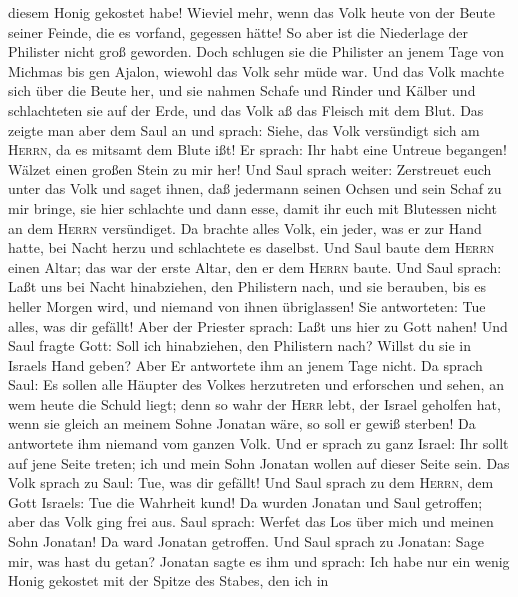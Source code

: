 diesem Honig gekostet habe!  Wieviel mehr, wenn das Volk
heute von der Beute seiner Feinde, die es vorfand, gegessen hätte! So
aber ist die Niederlage der Philister nicht groß geworden.
 Doch schlugen sie die Philister an jenem Tage von
Michmas bis gen Ajalon, wiewohl das Volk sehr müde war. 
Und das Volk machte sich über die Beute her, und sie nahmen Schafe und
Rinder und Kälber und schlachteten sie auf der Erde, und das Volk aß das
Fleisch mit dem Blut.  Das zeigte man aber dem Saul an
und sprach: Siehe, das Volk versündigt sich am \textsc{Herrn}, da es
mitsamt dem Blute ißt! Er sprach: Ihr habt eine Untreue begangen! Wälzet
einen großen Stein zu mir her!  Und Saul sprach weiter:
Zerstreuet euch unter das Volk und saget ihnen, daß jedermann seinen
Ochsen und sein Schaf zu mir bringe, sie hier schlachte und dann esse,
damit ihr euch mit Blutessen nicht an dem \textsc{Herrn} versündiget. Da
brachte alles Volk, ein jeder, was er zur Hand hatte, bei Nacht herzu
und schlachtete es daselbst.  Und Saul baute dem
\textsc{Herrn} einen Altar; das war der erste Altar, den er dem
\textsc{Herrn} baute.  Und Saul sprach: Laßt uns bei
Nacht hinabziehen, den Philistern nach, und sie berauben, bis es heller
Morgen wird, und niemand von ihnen übriglassen! Sie antworteten: Tue
alles, was dir gefällt! Aber der Priester sprach: Laßt uns hier zu Gott
nahen!  Und Saul fragte Gott: Soll ich hinabziehen, den
Philistern nach? Willst du sie in Israels Hand geben? Aber Er antwortete
ihm an jenem Tage nicht.  Da sprach Saul: Es sollen alle
Häupter des Volkes herzutreten und erforschen und sehen, an wem heute
die Schuld liegt;  denn so wahr der \textsc{Herr} lebt,
der Israel geholfen hat, wenn sie gleich an meinem Sohne Jonatan wäre,
so soll er gewiß sterben! Da antwortete ihm niemand vom ganzen Volk.
 Und er sprach zu ganz Israel: Ihr sollt auf jene Seite
treten; ich und mein Sohn Jonatan wollen auf dieser Seite sein. Das Volk
sprach zu Saul: Tue, was dir gefällt!  Und Saul sprach zu
dem \textsc{Herrn}, dem Gott Israels: Tue die Wahrheit kund! Da wurden
Jonatan und Saul getroffen; aber das Volk ging frei aus. 
Saul sprach: Werfet das Los über mich und meinen Sohn Jonatan! Da ward
Jonatan getroffen.  Und Saul sprach zu Jonatan: Sage mir,
was hast du getan?  Jonatan sagte es ihm und sprach: Ich
habe nur ein wenig Honig gekostet mit der Spitze des Stabes, den ich in
